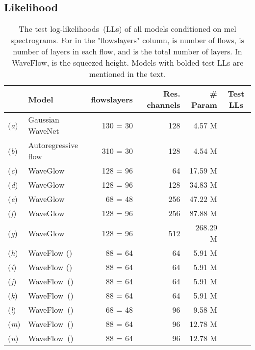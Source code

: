\documentclass{article}
\begin{document}
\subsection{Likelihood}
\vspace{-.1em}
\begin{table*}[t]
\centering
\caption{The test log-likelihoods~(LLs) of all models conditioned on mel spectrograms.
For  in the {"flowslayers"} column,  is number of flows,  is number of layers in each flow, and  is the total number of layers.
In WaveFlow,  is the squeezed height. Models with bolded test LLs are mentioned in the text.}
\vspace{0.25em}
\begin{tabular}{l|l|r|r|r|c}
\hline 
& \textbf{Model} & \textbf{flowslayers} & \textbf{Res. channels} &  \textbf{\# Param} 
& \textbf{Test LLs}   \\ \hline
(\emph{a}) & Gaussian WaveNet   & 130 = 30  \qquad & 128 \qquad & 4.57 M \qquad &    \\
(\emph{b}) & Autoregressive flow  & 310 = 30  \qquad & 128 \qquad & 4.54 M \qquad &    \\
(\emph{c}) & WaveGlow   & 128 = 96 \qquad & 64  \qquad & 17.59 M \qquad  &     \\
(\emph{d}) & WaveGlow  & 128 = 96  \qquad & 128 \qquad & 34.83 M \qquad &     \\
(\emph{e}) & WaveGlow  & 68 = 48  \qquad & 256 \qquad &  47.22 M \qquad &     \\
(\emph{f}) & WaveGlow  & 128 = 96  \qquad & 256 \qquad & 87.88 M \qquad &     \\
(\emph{g}) & WaveGlow  & 128 = 96  \qquad & 512 \qquad & 268.29 M \qquad &   \\ 
(\emph{h}) & WaveFlow ()  & 88 = 64  \qquad & 64 \qquad & 5.91 M \qquad &    \\
(\emph{i}) & WaveFlow () & 88 = 64  \qquad & 64 \qquad & 5.91 M \qquad &    \\
(\emph{j}) & WaveFlow~() & 88 = 64  \qquad & 64 \qquad & 5.91 M \qquad &    \\
(\emph{k}) & WaveFlow~() & 88 = 64  \qquad & 64 \qquad & 5.91 M \qquad &     \\
(\emph{l}) & WaveFlow~()  & 68 = 48  \qquad & 96 \qquad & 9.58 M \qquad &    \\
(\emph{m}) & WaveFlow~()  & 88 = 64  \qquad & 96 \qquad & 12.78 M \qquad &    \\
(\emph{n}) & WaveFlow~()  & 88 = 64  \qquad & 96 \qquad & 12.78 M \qquad &    \\

\end{tabular}
\end{table*}
\end{document}
